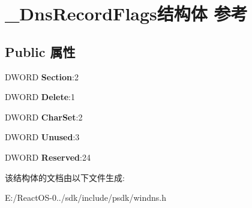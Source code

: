 \hypertarget{struct___dns_record_flags}{}\section{\+\_\+\+Dns\+Record\+Flags结构体 参考}
\label{struct___dns_record_flags}
\subsection*{Public 属性}
\begin{DoxyCompactItemize}
\item 
\mbox{\label{struct___dns_record_flags_afa08fb0c99c6074bb05c77739493657b}} 
D\+W\+O\+RD {\bfseries Section}\+:2
\item 
\mbox{\label{struct___dns_record_flags_a0de58a8536e265c36d1f171ec07fcc42}} 
D\+W\+O\+RD {\bfseries Delete}\+:1
\item 
\mbox{\label{struct___dns_record_flags_a6267b2a7ffe3d42c1dd98969ca5f99b1}} 
D\+W\+O\+RD {\bfseries Char\+Set}\+:2
\item 
\mbox{\label{struct___dns_record_flags_a21402cd5740b9d2c4a8b10190e43c811}} 
D\+W\+O\+RD {\bfseries Unused}\+:3
\item 
\mbox{\label{struct___dns_record_flags_a585ed2ff92c5ca3c5aee93b876e08448}} 
D\+W\+O\+RD {\bfseries Reserved}\+:24
\end{DoxyCompactItemize}


该结构体的文档由以下文件生成\+:\begin{DoxyCompactItemize}
\item 
E\+:/\+React\+O\+S-\/0../sdk/include/psdk/windns.\+h\end{DoxyCompactItemize}
